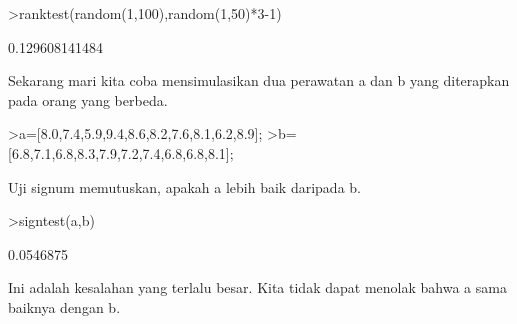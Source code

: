 \documentclass[a4paper,10pt]{article}
\begin{document}
\begin{eulernotebook}
\begin{eulercomment}
\begin{eulercomment}
\begin{eulercomment}
\begin{eulercomment}
\begin{eulercomment}
\begin{eulercomment}
\begin{eulercomment}
\begin{eulercomment}
\begin{eulercomment}
\begin{eulercomment}
\begin{eulercomment}
\begin{eulercomment}
\begin{eulercomment}
\begin{eulercomment}
\begin{eulercomment}
\begin{eulercomment}
\begin{eulercomment}
\begin{eulercomment}
\begin{eulercomment}
\begin{eulercomment}
\begin{eulercomment}
\begin{eulercomment}
\begin{eulercomment}
\begin{eulercomment}
\begin{eulercomment}
\begin{eulercomment}
\begin{eulercomment}
\begin{eulercomment}
\begin{eulercomment}
\begin{eulercomment}
\begin{eulercomment}
\begin{eulercomment}
\begin{eulercomment}
\begin{eulercomment}
\begin{eulercomment}
\begin{eulercomment}
\begin{eulercomment}
\begin{eulercomment}
\begin{eulercomment}
\begin{eulercomment}
\begin{eulercomment}
\begin{eulercomment}
\begin{eulercomment}
\begin{eulercomment}
\begin{eulercomment}
\begin{eulercomment}
\begin{eulercomment}
\end{eulercomment}
\begin{eulerprompt}
>ranktest(random(1,100),random(1,50)*3-1)
\end{eulerprompt}
\begin{euleroutput}
  0.129608141484
\end{euleroutput}
\begin{eulercomment}
Sekarang mari kita coba mensimulasikan dua perawatan a dan b yang
diterapkan pada orang yang berbeda.
\end{eulercomment}
\begin{eulerprompt}
>a=[8.0,7.4,5.9,9.4,8.6,8.2,7.6,8.1,6.2,8.9];
>b=[6.8,7.1,6.8,8.3,7.9,7.2,7.4,6.8,6.8,8.1];
\end{eulerprompt}
\begin{eulercomment}
Uji signum memutuskan, apakah a lebih baik daripada b.
\end{eulercomment}
\begin{eulerprompt}
>signtest(a,b)
\end{eulerprompt}
\begin{euleroutput}
  0.0546875
\end{euleroutput}
\begin{eulercomment}
Ini adalah kesalahan yang terlalu besar. Kita tidak dapat menolak
bahwa a sama baiknya dengan b.


\end{eulercomment}
\end{eulercomment}
\end{eulercomment}
\end{eulercomment}
\end{eulercomment}
\end{eulercomment}
\end{eulercomment}
\end{eulercomment}
\end{eulercomment}
\end{eulercomment}
\end{eulercomment}
\end{eulercomment}
\end{eulercomment}
\end{eulercomment}
\end{eulercomment}
\end{eulercomment}
\end{eulercomment}
\end{eulercomment}
\end{eulercomment}
\end{eulercomment}
\end{eulercomment}
\end{eulercomment}
\end{eulercomment}
\end{eulercomment}
\end{eulercomment}
\end{eulercomment}
\end{eulercomment}
\end{eulercomment}
\end{eulercomment}
\end{eulercomment}
\end{eulercomment}
\end{eulercomment}
\end{eulercomment}
\end{eulercomment}
\end{eulercomment}
\end{eulercomment}
\end{eulercomment}
\end{eulercomment}
\end{eulercomment}
\end{eulercomment}
\end{eulercomment}
\end{eulercomment}
\end{eulercomment}
\end{eulercomment}
\end{eulercomment}
\end{eulercomment}
\end{eulercomment}
\end{eulernotebook}
\end{document}
